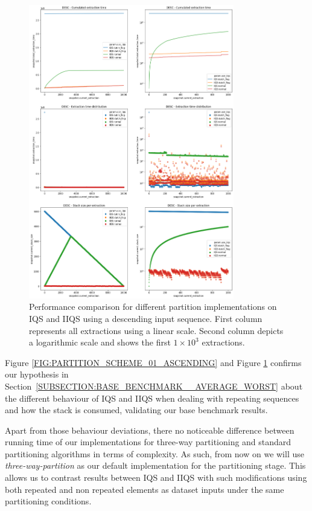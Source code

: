 \begin{figure}[!ht]
    \centering
    \includegraphics[width=0.8\textwidth]{./fragments/04_experimental_execution/images/02_basebenchmark_03_sort_d_case.png}
    \caption{Performance comparison for different partition implementations on IQS and IIQS using a descending input sequence. First column represents all extractions using a linear scale. Second column depicts a logarithmic scale and shows the first $1\times10^3$ extractions.}
    \label{FIG:PARTITION_SCHEME_01_DESCENDING}
\end{figure}

Figure \ref{FIG:PARTITION_SCHEME_01_ASCENDING} and Figure \ref{FIG:PARTITION_SCHEME_01_DESCENDING} confirms our hypothesis in Section~\ref{SUBSECTION:BASE_BENCHMARK__AVERAGE_WORST} about the different behaviour of IQS and IIQS when dealing with repeating sequences and how the stack is consumed, validating our base benchmark results.

Apart from those behaviour deviations, there no noticeable difference between running time of our implementations for three-way partitioning and standard partitioning algorithms in terms of complexity. As such, from now on we will use \textit{three-way-partition} as our default implementation for the partitioning stage. This allows us to contrast results between IQS and IIQS with such modifications using both repeated and non repeated elements as dataset inputs under the same partitioning conditions.

\FloatBarrier